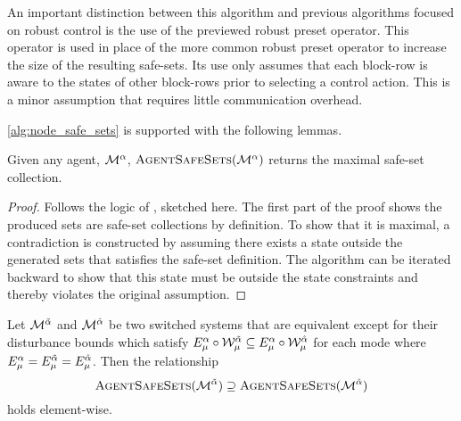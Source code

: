 \begin{remark}
An important distinction between this algorithm and previous algorithms focused on robust control is the use of the previewed robust preset operator. This operator is used in place of the more common robust preset operator to increase the size of the resulting safe-sets. Its use only assumes that each block-row is aware to the states of other block-rows prior to selecting a control action. This is a minor assumption that requires little communication overhead.
\end{remark}
\autoref{alg:node_safe_sets} is supported with the following lemmas. 
\begin{lemma}\label{lemma:maximal_proof}
Given any agent, $\mathcal{M}^{\alpha}$, $\Call{AgentSafeSets}{\agent{\agentidx}}$ returns the maximal safe-set collection.
\end{lemma}
\begin{proof}
Follows the logic of \cite[Theorem 2]{Danielson2019}, sketched here. The first part of the proof shows the produced sets are safe-set collections by definition. To show that it is maximal, a contradiction is constructed by assuming there exists a state outside the generated sets that satisfies the safe-set definition. The algorithm can be iterated backward to show that this state must be outside the state constraints and thereby violates the original assumption.
\end{proof}
\begin{lemma}
Let $\mathcal{M}^{\tilde{\alpha}}$ and $\mathcal{M}^{\hat{\alpha}}$ be two switched systems that are equivalent except for their disturbance bounds which satisfy $E_{{\mu}}^{\alpha}\circ\mathcal{W}^{\tilde{\alpha}}_{\mu}\subseteq E_{{\mu}}^{\alpha}\circ\mathcal{W}^{\hat{\alpha}}_{\mu}$ for each mode where $E_{{\mu}}^{\alpha}=E_{{\mu}}^{\tilde{\alpha}}=E_{{\mu}}^{\hat{\alpha}}$. Then the relationship
$$\Call{AgentSafeSets}{\agent{\tilde\agentidx}}\supseteq\Call{AgentSafeSets}{\agent{\hat\agentidx}}$$
 holds element-wise. 
\end{lemma}
